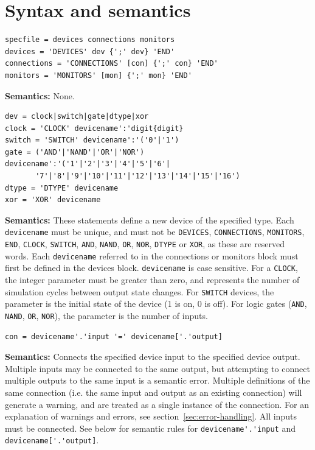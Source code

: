 \documentclass[a4paper,10pt]{article}
\begin{document}
\section{Syntax and semantics}

\begin{verbatim}
specfile = devices connections monitors
devices = 'DEVICES' dev {';' dev} 'END'
connections = 'CONNECTIONS' [con] {';' con} 'END' 
monitors = 'MONITORS' [mon] {';' mon} 'END'
\end{verbatim} 

\textbf{Semantics:} None.

\begin{verbatim}
dev = clock|switch|gate|dtype|xor
clock = 'CLOCK' devicename':'digit{digit}
switch = 'SWITCH' devicename':'('0'|'1')
gate = ('AND'|'NAND'|'OR'|'NOR') devicename':'('1'|'2'|'3'|'4'|'5'|'6'|
       '7'|'8'|'9'|'10'|'11'|'12'|'13'|'14'|'15'|'16')
dtype = 'DTYPE' devicename
xor = 'XOR' devicename
\end{verbatim} 

\textbf{Semantics:} These statements define a new device of the specified type. Each \texttt{devicename} must be unique, and must not be \texttt{DEVICES}, \texttt{CONNECTIONS}, \texttt{MONITORS}, \texttt{END}, \texttt{CLOCK}, \texttt{SWITCH}, \texttt{AND}, \texttt{NAND}, \texttt{OR}, \texttt{NOR}, \texttt{DTYPE} or \texttt{XOR}, as these are reserved words.
Each \texttt{devicename} referred to in the connections or monitors block must first be defined in the devices block. \texttt{devicename} is case sensitive. For a \texttt{CLOCK}, the integer parameter must be greater than zero, and represents the number of simulation cycles between output state changes. For \texttt{SWITCH} devices, the parameter is the initial state of the device (1 is on, 0 is off).
For logic gates (\texttt{AND}, \texttt{NAND}, \texttt{OR}, \texttt{NOR}), the parameter is the number of inputs.

\begin{verbatim}
con = devicename'.'input '=' devicename['.'output]
\end{verbatim} 
\textbf{Semantics:} Connects the specified device input to the specified device output. Multiple inputs may be connected to the same output, but attempting to connect multiple outputs to the same input is a semantic error. Multiple definitions of the same connection (i.e. the same input and output as an existing connection) will generate a warning, and are treated as a single instance of the connection. For an explanation of warnings and errors, see section~\ref{sec:error-handling}. All inputs must be connected. See below for semantic rules for \verb|devicename'.'input| and \verb|devicename['.'output]|.
\end{document}
